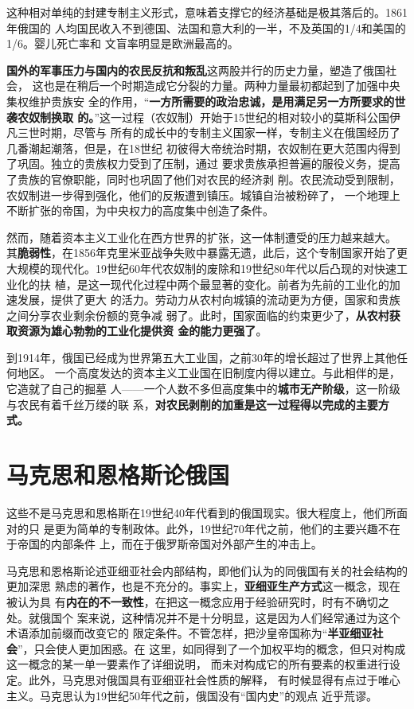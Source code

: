 这种相对单纯的封建专制主义形式，意味着支撑它的经济基础是极其落后的。1861年俄国的
人均国民收入不到德国、法国和意大利的一半，不及英国的1/4和美国的1/6。婴儿死亡率和
文盲率明显是欧洲最高的。

\textbf{国外的军事压力与国内的农民反抗和叛乱}这两股并行的历史力量，塑造了俄国社会，
这也是在稍后一个时期造成它分裂的力量。两种力量最初都起到了加强中央集权维护贵族安
全的作用，“\textbf{一方所需要的政治忠诚，是用满足另一方所要求的世袭农奴制换取
  的。}”这一过程（农奴制）开始于15世纪的相对较小的莫斯科公国伊凡三世时期，尽管与
所有的成长中的专制主义国家一样，专制主义在俄国经历了几番潮起潮落，但是，在18世纪
初彼得大帝统治时期，农奴制在更大范围内得到了巩固。独立的贵族权力受到了压制，通过
要求贵族承担普遍的服役义务，提高了贵族的官僚职能，同时也巩固了他们对农民的经济剥
削。农民流动受到限制，农奴制进一步得到强化，他们的反叛遭到镇压。城镇自治被粉碎了，
一个地理上不断扩张的帝国，为中央权力的高度集中创造了条件。

然而，随着资本主义工业化在西方世界的扩张，这一体制遭受的压力越来越大。
其\textbf{脆弱性}，在1856年克里米亚战争失败中暴露无遗，此后，这个专制国家开始了更
大规模的现代化。19世纪60年代农奴制的废除和19世纪80年代以后凸现的对快速工业化的扶
植，是这一现代化过程中两个最显著的变化。前者为先前的工业化的加速发展，提供了更大
的活力。劳动力从农村向城镇的流动更为方便，国家和贵族之间分享农业剩余份额的竞争减
弱了。此时，国家面临的约束更少了，\textbf{从农村获取资源为雄心勃勃的工业化提供资
  金的能力更强了}。

到1914年，俄国已经成为世界第五大工业国，之前30年的增长超过了世界上其他任何地区。
一个高度发达的资本主义工业国在旧制度内得以建立。与此相伴的是，它造就了自己的掘墓
人——一个人数不多但高度集中的\textbf{城市无产阶级}，这一阶级与农民有着千丝万缕的联
系，\textbf{对农民剥削的加重是这一过程得以完成的主要方式。}

\section{马克思和恩格斯论俄国}
这些不是马克思和恩格斯在19世纪40年代看到的俄国现实。很大程度上，他们所面对的只
是更为简单的专制政体。此外，19世纪70年代之前，他们的主要兴趣不在于帝国的内部条件
上，而在于俄罗斯帝国对外部产生的冲击上。

马克思和恩格斯论述亚细亚社会内部结构，即他们认为的同俄国有关的社会结构的更加深思
熟虑的著作，也是不充分的。事实上，\textbf{亚细亚生产方式}这一概念，现在被认为具
有\textbf{内在的不一致性}，在把这一概念应用于经验研究时，时有不确切之处。就俄国个
案来说，这种情况并不是十分明显，这是因为人们经常通过为这个术语添加前缀而改变它的
限定条件。不管怎样，把沙皇帝国称为“\textbf{半亚细亚社会}”，只会使人更加困惑。在
这里，如同得到了一个加权平均的概念，但只对构成这一概念的某一单一要素作了详细说明，
而未对构成它的所有要素的权重进行设定。此外，马克思对俄国具有亚细亚社会性质的解释，
有时候显得有点过于唯心主义。马克思认为19世纪50年代之前，俄国没有“国内史”的观点
近乎荒谬。

